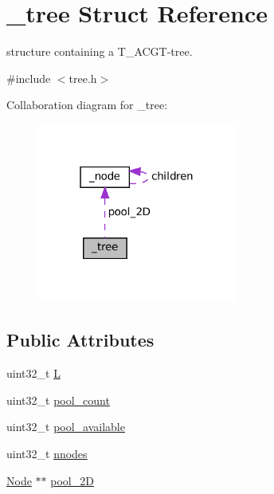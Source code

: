 \hypertarget{struct__tree}{}\section{\+\_\+tree Struct Reference}
\label{struct__tree}


structure containing a T\+\_\+\+A\+C\+G\+T-\/tree.  




{\ttfamily \#include $<$tree.\+h$>$}



Collaboration diagram for \+\_\+tree\+:
\nopagebreak
\begin{figure}[H]
\begin{center}
\leavevmode
\includegraphics[width=187pt]{struct__tree__coll__graph}
\end{center}
\end{figure}
\subsection*{Public Attributes}
\begin{DoxyCompactItemize}
\item 
uint32\+\_\+t \mbox{\hyperlink{struct__tree_a36ca6c909dd7c119452da0cb49e2c829}{L}}
\item 
uint32\+\_\+t \mbox{\hyperlink{struct__tree_aa90c2b558fc833fc22bcd6617689a41f}{pool\+\_\+count}}
\item 
uint32\+\_\+t \mbox{\hyperlink{struct__tree_afd3769cd9db40fa460d35a0033fb7d02}{pool\+\_\+available}}
\item 
uint32\+\_\+t \mbox{\hyperlink{struct__tree_abffdcd9dcf0df92df4b5444fb74cc523}{nnodes}}
\item 
\mbox{\hyperlink{tree_8h_a6390a1d02010dee1843fa2b1263308c1}{Node}} $\ast$$\ast$ \mbox{\hyperlink{struct__tree_a2783a2aaf32fc3b3c9de8b9fbb14de58}{pool\+\_\+2D}}
\end{DoxyCompactItemize}



